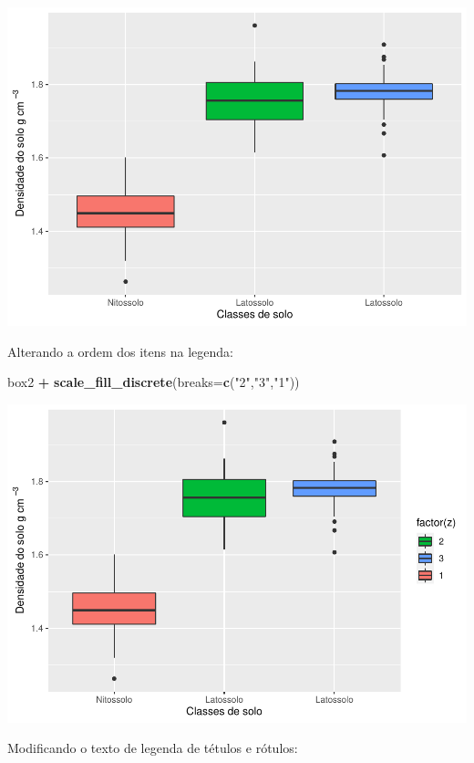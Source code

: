 \documentclass[
]{book}
\newenvironment{Shaded}{\begin{snugshade}}{\end{snugshade}}
\newcommand{\DataTypeTok}[1]{\textcolor[rgb]{0.13,0.29,0.53}{#1}}
\newcommand{\KeywordTok}[1]{\textcolor[rgb]{0.13,0.29,0.53}{\textbf{#1}}}
\newcommand{\NormalTok}[1]{#1}
\newcommand{\OperatorTok}[1]{\textcolor[rgb]{0.81,0.36,0.00}{\textbf{#1}}}
\newcommand{\StringTok}[1]{\textcolor[rgb]{0.31,0.60,0.02}{#1}}
\begin{document}
\includegraphics{TudodoR_files/figure-latex/unnamed-chunk-210-1.pdf}

Alterando a ordem dos itens na legenda:

\begin{Shaded}
\begin{Highlighting}[]
\NormalTok{box2 }\OperatorTok{+}\StringTok{ }\KeywordTok{scale_fill_discrete}\NormalTok{(}\DataTypeTok{breaks=}\KeywordTok{c}\NormalTok{(}\StringTok{"2"}\NormalTok{,}\StringTok{"3"}\NormalTok{,}\StringTok{"1"}\NormalTok{))}
\end{Highlighting}
\end{Shaded}

\includegraphics{TudodoR_files/figure-latex/unnamed-chunk-211-1.pdf}

Modificando o texto de legenda de tétulos e rótulos:
\end{document}
